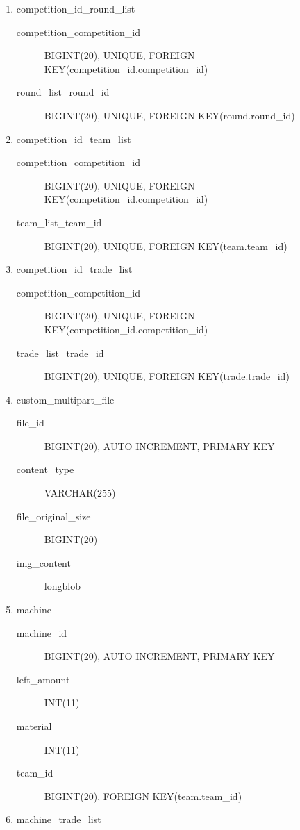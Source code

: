 \documentclass{article}
\begin{document}
{\begin{enumerate}
  \item competition\_id\_round\_list
    \begin{description}
      \item[competition\_competition\_id] BIGINT(20), UNIQUE, FOREIGN KEY(competition\_id.competition\_id)
      \item[round\_list\_round\_id] BIGINT(20), UNIQUE, FOREIGN KEY(round.round\_id)
    \end{description}
  \item competition\_id\_team\_list
    \begin{description}
      \item[competition\_competition\_id] BIGINT(20), UNIQUE, FOREIGN KEY(competition\_id.competition\_id)
      \item[team\_list\_team\_id] BIGINT(20), UNIQUE, FOREIGN KEY(team.team\_id)
    \end{description}
  \item competition\_id\_trade\_list
    \begin{description}
      \item[competition\_competition\_id] BIGINT(20), UNIQUE, FOREIGN KEY(competition\_id.competition\_id)
      \item[trade\_list\_trade\_id] BIGINT(20), UNIQUE, FOREIGN KEY(trade.trade\_id)
    \end{description}
  \item custom\_multipart\_file
    \begin{description}
      \item[file\_id] BIGINT(20), AUTO INCREMENT, PRIMARY KEY
      \item[content\_type] VARCHAR(255)
      \item[file\_original\_size] BIGINT(20)
      \item[img\_content] longblob
    \end{description}
  \item machine
    \begin{description}
      \item[machine\_id] BIGINT(20), AUTO INCREMENT, PRIMARY KEY
      \item[left\_amount] INT(11)
      \item[material] INT(11)
      \item[team\_id] BIGINT(20), FOREIGN KEY(team.team\_id)
    \end{description}
  \item machine\_trade\_list
    \begin{description}

\end{description}
\end{enumerate}}
\end{document}
